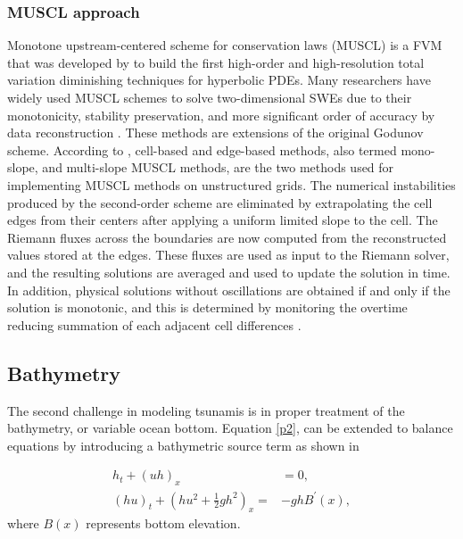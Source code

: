 \documentclass[9pt,a4paper]{article}
\begin{document}
	\subsubsection{MUSCL approach}
	
	Monotone upstream-centered scheme for conservation laws (MUSCL) is a FVM that was developed by \citet{van1979towards} to build the first high-order and high-resolution total variation diminishing techniques for hyperbolic PDEs. Many researchers have widely used MUSCL schemes to solve two-dimensional SWEs due to their monotonicity, stability preservation, and more significant order of accuracy by data reconstruction \citep{song2011robust,zhao2019improved,marche2007evaluation,liang2009adaptive}.  These methods are extensions of the original Godunov scheme.     According to  \citet{hou20132d}, cell-based and edge-based methods, also termed mono-slope, and multi-slope MUSCL methods, are the two methods used for implementing MUSCL methods on unstructured grids. The numerical instabilities produced by the second-order scheme are eliminated by extrapolating the cell edges from their centers after applying a uniform limited slope to the cell. The Riemann fluxes across the boundaries are now computed from the reconstructed values stored at the edges.  These fluxes are used as input to the Riemann solver, and the resulting solutions are averaged and used to update the solution in time.  In addition, physical solutions without oscillations are obtained if and only if the solution is monotonic, and this is determined by monitoring the overtime reducing summation of each adjacent cell differences \citep{hou2014multislope}.
	
	
	
	
	
	
	\subsection{Bathymetry}
	The second challenge in modeling tsunamis is in proper treatment of the bathymetry, or variable ocean bottom. 
	Equation \eqref{p2}, can be extended to balance equations by introducing a bathymetric source term as shown in 
	
	\begin{equation}
		\begin{aligned}
			h_{t} + (uh)_x &= 0, \\
			(hu)_t + \left(hu^{2} + \frac{1}{2}gh^{2} \right)_x =& -ghB^{\prime}(x),
			\label{bst}
		\end{aligned}
	\end{equation}	
	where $B(x)$ represents bottom elevation. 
	
\end{document}
